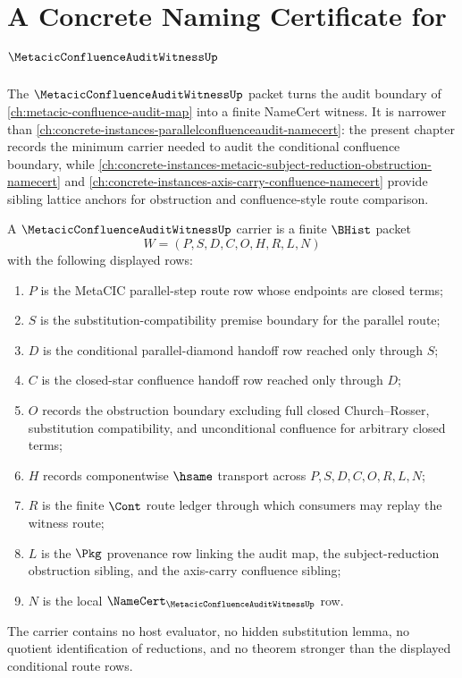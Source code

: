 \chapter{A Concrete Naming Certificate for $\MetacicConfluenceAuditWitnessUp$}
\label{ch:concrete-instances-metacicconfluenceauditwitness-namecert}

The $\MetacicConfluenceAuditWitnessUp$ packet turns the audit boundary of \autoref{ch:metacic-confluence-audit-map} into a finite NameCert witness. It is narrower than \autoref{ch:concrete-instances-parallelconfluenceaudit-namecert}: the present chapter records the minimum carrier needed to audit the conditional confluence boundary, while \autoref{ch:concrete-instances-metacic-subject-reduction-obstruction-namecert} and \autoref{ch:concrete-instances-axis-carry-confluence-namecert} provide sibling lattice anchors for obstruction and confluence-style route comparison.

\begin{definition}
\label{def:metacic-confluence-audit-witness-carrier}
A $\MetacicConfluenceAuditWitnessUp$ carrier is a finite $\BHist$ packet
$$
W=(P,S,D,C,O,H,R,L,N)
$$
with the following displayed rows:
\begin{enumerate}
\item $P$ is the MetaCIC parallel-step route row whose endpoints are closed terms;
\item $S$ is the substitution-compatibility premise boundary for the parallel route;
\item $D$ is the conditional parallel-diamond handoff row reached only through $S$;
\item $C$ is the closed-star confluence handoff row reached only through $D$;
\item $O$ records the obstruction boundary excluding full closed Church--Rosser, substitution compatibility, and unconditional confluence for arbitrary closed terms;
\item $H$ records componentwise $\hsame$ transport across $P,S,D,C,O,R,L,N$;
\item $R$ is the finite $\Cont$ route ledger through which consumers may replay the witness route;
\item $L$ is the $\Pkg$ provenance row linking the audit map, the subject-reduction obstruction sibling, and the axis-carry confluence sibling;
\item $N$ is the local $\NameCert_{\MetacicConfluenceAuditWitnessUp}$ row.
\end{enumerate}
The carrier contains no host evaluator, no hidden substitution lemma, no quotient identification of reductions, and no theorem stronger than the displayed conditional route rows.
\end{definition}

